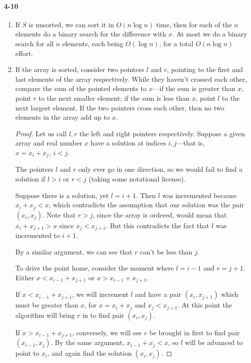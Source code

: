 \documentclass{report}
\begin{document}
\paragraph{4-10}
\begin{enumerate}[label=(\alph*)]
	\item If $S$ is unsorted, we can sort it in $O(n\log n)$ time, then for each of the $n$ elements do a binary search for the difference with $x$. At most we do a binary search for all $n$ elements, each being $O(\log n)$, for a total $O(n\log n)$ effort.

	\item If the array is sorted, consider two pointers $l$ and $r$, pointing to the first and last elements of the array respectively. While they haven't crossed each other, compare the sum of the pointed elements to $x$---if the sum is greater than $x$, point $r$ to the next smaller element; if the sum is less than $x$, point $l$ to the next largest element. If the two pointers cross each other, then no two elements in the array add up to $x$.

	\begin{proof}Let us call $l, r$ the left and right pointers respectively. Suppose a given array and real number $x$ have a solution at indices $i, j$---that is, $x = x_i + x_j,\ i<j$.

	The pointers $l$ and $r$ only ever go in one direction, so we would fail to find a solution if $l>i$ or $r<j$ (taking some notational license).

	Suppose there is a solution, yet $l = i+1$. Then $l$ was incremented because $x_i + x_j < x$, which contradicts the assumption that our solution was the pair $(x_i, x_j)$. Note that $r>j$, since the array is ordered, would mean that $x_i+x_{j+1} > x$ since $x_j < x_{j+1}$. But this contradicts the fact that $l$ was incremented to $i+1$.

	By a similar argument, we can see that $r$ can't be less than $j$.

	\bigskip

	To drive the point home, consider the moment where $l=i-1$ and $r=j+1$. Either $x < x_{i-1} + x_{j+1}$ or $x > x_{i-1} + x_{j+1}$.

	If $x < x_{i-1} + x_{j+1}$, we will increment $l$ and have a pair $(x_i,x_{j+1})$ which must be greater than $x$, for $x = x_i + x_j$ and $x_j < x_{j+1}$. At this point the algorithm will bring $r$ in to find pair $(x_i, x_j)$.

	If $x > x_{i-1} + x_{j+1}$, conversely, we will see $r$ be brought in first to find pair $(x_{i-1}, x_j)$. By the same argument, $x_{i-1} + x_j < x$, so $l$ will be advanced to point to $x_i$, and again find the solution $(x_i,x_j)$.
	\end{proof}
\end{enumerate}
\end{document}
